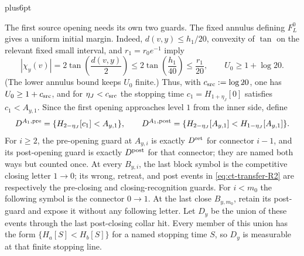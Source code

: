 \documentclass[12pt,reqno]{amsart}
\makeatletter
\theoremstyle{plain}
\theoremstyle{definition}
\theoremstyle{remark}
\renewenvironment{proof}[1][\proofname]{%
  \par
  \pushQED{\qed}%
  \normalfont
  \topsep6pt plus6pt\relax
  \trivlist
  \item[\hskip\labelsep\slshape #1\@addpunct{.}]%
  \ignorespaces
}{%
  \popQED
  \endtrivlist
  \@endpefalse
}
\DeclareRobustCommand{\qed}{%
  \leavevmode\unskip\penalty9999\hbox{}\nobreak
  \ifmmode
    \makebox[0pt][l]{\qquad\hbox{\qedsymbol}}%
  \else
    \qquad\hbox{\qedsymbol}%
  \fi
}
\renewcommand{\qedsymbol}{\rule[.47pt]{4pt}{6pt}}
\numberwithin{equation}{section}
\makeatother
\begin{document}
\begin{proof}[Proof of Lemma~\ref{lem:buffered-transfer}]
The first source opening needs its own two guards.  The fixed annulus
defining $F_L^0$ gives a uniform initial margin.  Indeed,
$d(v,y)\le h_1/20$, convexity of $\tan$ on the relevant fixed small
interval, and $r_1=r_0e^{-1}$ imply
\[
|\chi_y(v)|=2\tan\!\left(\frac{d(v,y)}2\right)
 \le 2\tan\!\left(\frac{h_1}{40}\right)
 \le \frac{r_1}{20},
 \qquad U_0\ge1+\log20.
\]
(The lower annulus bound keeps $U_0$ finite.)  Thus, with
$c_{\rm src}:=\log20$, one has $U_0\ge1+c_{\rm src}$, and for
$\eta_J<c_{\rm src}$ the stopping time
$c_1=H_{1+\eta_J}[0]$ satisfies $c_1<A_{y,1}$.  Since the first
opening approaches level $1$ from the inner side, define
\begin{equation}
D^{A_1,{\rm pre}}=\{H_{2-\eta_J}[c_1]<A_{y,1}\},\qquad
 D^{A_1,{\rm post}}=
 \{H_{2-\eta_J}[A_{y,1}]<H_{1-\eta_J}[A_{y,1}]\}.\label{eq:ct-transfer-R2a}
\end{equation}
For $i\ge2$, the pre-opening guard at $A_{y,i}$ is exactly
$D^{\rm ret}$ for connector $i-1$, and its post-opening guard is
exactly $D^{\rm post}$ for that connector; they are named both ways
but counted once.  At every $B_{y,i}$, the last block symbol is the
competitive closing letter $1\to0$; its wrong, retreat, and post events
in \eqref{eq:ct-transfer-R2} are respectively the pre-closing and closing-recognition guards.
For $i<m_0$ the following symbol is the connector $0\to1$.  At the
last close $B_{y,m_0}$, retain its post-guard and expose it without any
following letter.  Let $D_y$ be the union of these events through the
last post-closing collar hit.  Every member of this union has the form
$\{H_a[S]<H_b[S]\}$ for a named stopping time $S$, so $D_y$ is
measurable at that finite stopping line.


\end{proof}
\end{document}
